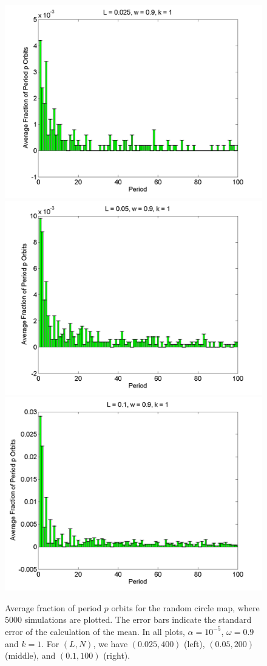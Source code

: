 \begin{figure}[H]\linespread{1}
\caption[Average fraction of period $p$ orbits for the random circle
map (uniform distribution), for $\alpha = 10^{-5}$, $\omega=0.9$ and $k=1$]{Average fraction of period $p$ orbits for the random circle
map, where 5000 simulations are plotted. The error bars indicate
the standard error of the calculation of the mean. In all plots,
$\alpha = 10^{-5}$, $\omega=0.9$ and $k=1$. For $(L,N)$,
we have $(0.025, 400)$ (left), $(0.05, 200)$
(middle), and $(0.1, 100)$ (right).}\label{fig:rcirchist_u_ma1}
	\begin{center}
\includegraphics[width=.33\textwidth]{figs/rcirc_hist_u_L_0025_w_09_k_1_sims_5000.png}\hfill
\includegraphics[width=.33\textwidth]{figs/rcirc_hist_u_L_005_w_09_k_1_sims_5000.png}\hfill
\includegraphics[width=.33\textwidth]{figs/rcirc_hist_u_L_01_w_09_k_1_sims_5000.png}
	\end{center}
\end{figure}

